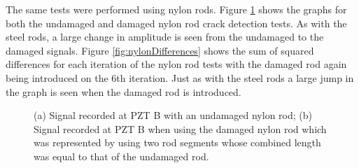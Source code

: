 The same tests were performed using nylon rods. Figure \ref{fig:nylonCrackResults} shows the graphs for both the undamaged and damaged nylon rod crack detection tests. As with the steel rods, a large change in amplitude is seen from the undamaged to the damaged signals. Figure \ref{fig:nylonDifferences} shows the sum of squared differences for each iteration of the nylon rod tests with the damaged rod again being introduced on the 6th iteration. Just as with the steel rods a large jump in the graph is seen when the damaged rod is introduced.

\begin{figure}[ht!]
\begin{subfigmatrix}{2}
\end{subfigmatrix}

  \caption
  { \label{fig:nylonCrackResults}
(a) Signal recorded at PZT B with an undamaged nylon rod;
(b) Signal recorded at PZT B when using the damaged nylon rod which was represented by using two rod segments whose combined length was equal to that of the undamaged rod.
}
\end{figure}

